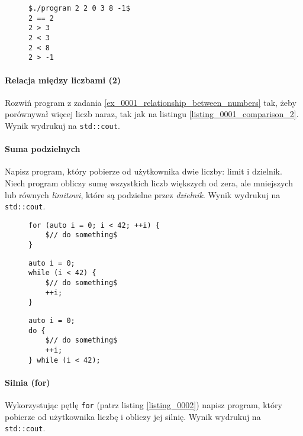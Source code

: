 \documentclass[11pt,a4paper,titlepage,onecolumn]{article}
\begin{document}
\begin{figure}
\begin{lstlisting}[caption={relacja między liczbami (2)},
    captionpos=b,
    label=listing_0001_comparison_2]
$./program 2 2 0 3 8 -1$
2 == 2
2 > 3
2 < 3
2 < 8
2 > -1
\end{lstlisting}
\end{figure}

\paragraph{Relacja między liczbami (2)} Rozwiń program z zadania
\ref{ex_0001_relationship_between_numbers} tak, żeby porównywał więcej liczb
naraz, tak jak na listingu \ref{listing_0001_comparison_2}.
Wynik wydrukuj na \texttt{std::cout}.

\paragraph{Suma podzielnych} Napisz program, który pobierze od użytkownika dwie
liczby: limit i dzielnik. Niech program obliczy sumę wszystkich liczb większych
od zera, ale mniejszych lub równych \emph{limitowi}, które są podzielne przez
\emph{dzielnik}.
Wynik wydrukuj na \texttt{std::cout}.

\begin{figure}
\begin{lstlisting}[caption={pętla for},
    captionpos=b,
    label=listing_0002]
for (auto i = 0; i < 42; ++i) {
    $// do something$
}
\end{lstlisting}
\end{figure}

\begin{figure}
\begin{lstlisting}[caption={pętla while},
    captionpos=b,
    label=listing_0003]
auto i = 0;
while (i < 42) {
    $// do something$
    ++i;
}
\end{lstlisting}
\end{figure}

\begin{figure}
\begin{lstlisting}[caption={pętla do-while},
    captionpos=b,
    label=listing_0004]
auto i = 0;
do {
    $// do something$
    ++i;
} while (i < 42);
\end{lstlisting}
\end{figure}

\paragraph{Silnia (for)} Wykorzystując pętlę \texttt{for} (patrz listing
\ref{listing_0002}) napisz program, który pobierze od użytkownika liczbę i
obliczy jej silnię. Wynik wydrukuj na \texttt{std::cout}.
\end{document}
